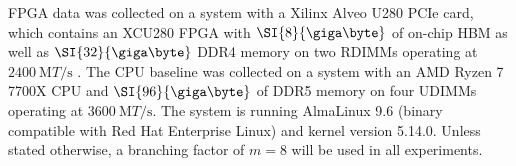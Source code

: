

FPGA data was collected on a system with a Xilinx Alveo U280 PCIe card,
which contains an XCU280 FPGA with $\SI{8}{\giga\byte}$ of on-chip HBM as well
as $\SI{32}{\giga\byte}$ DDR4 memory on two RDIMMs operating at
$\SI{2400}{\mega{T}\per\second}$ \autocite{u280}. The CPU baseline was collected
on a system with an AMD Ryzen 7 7700X CPU and $\SI{96}{\giga\byte}$ of DDR5
memory on four UDIMMs operating at $\SI{3600}{\mega{T}\per\second}$. The system
is running AlmaLinux 9.6 (binary compatible with Red Hat Enterprise Linux) and
kernel version 5.14.0.
%
Unless stated otherwise, a branching factor of $m=8$ will be used in all
experiments.
